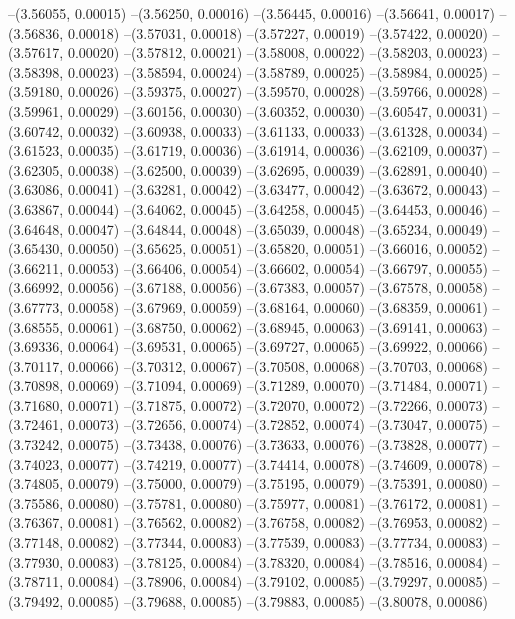 --(3.56055, 0.00015)
--(3.56250, 0.00016)
--(3.56445, 0.00016)
--(3.56641, 0.00017)
--(3.56836, 0.00018)
--(3.57031, 0.00018)
--(3.57227, 0.00019)
--(3.57422, 0.00020)
--(3.57617, 0.00020)
--(3.57812, 0.00021)
--(3.58008, 0.00022)
--(3.58203, 0.00023)
--(3.58398, 0.00023)
--(3.58594, 0.00024)
--(3.58789, 0.00025)
--(3.58984, 0.00025)
--(3.59180, 0.00026)
--(3.59375, 0.00027)
--(3.59570, 0.00028)
--(3.59766, 0.00028)
--(3.59961, 0.00029)
--(3.60156, 0.00030)
--(3.60352, 0.00030)
--(3.60547, 0.00031)
--(3.60742, 0.00032)
--(3.60938, 0.00033)
--(3.61133, 0.00033)
--(3.61328, 0.00034)
--(3.61523, 0.00035)
--(3.61719, 0.00036)
--(3.61914, 0.00036)
--(3.62109, 0.00037)
--(3.62305, 0.00038)
--(3.62500, 0.00039)
--(3.62695, 0.00039)
--(3.62891, 0.00040)
--(3.63086, 0.00041)
--(3.63281, 0.00042)
--(3.63477, 0.00042)
--(3.63672, 0.00043)
--(3.63867, 0.00044)
--(3.64062, 0.00045)
--(3.64258, 0.00045)
--(3.64453, 0.00046)
--(3.64648, 0.00047)
--(3.64844, 0.00048)
--(3.65039, 0.00048)
--(3.65234, 0.00049)
--(3.65430, 0.00050)
--(3.65625, 0.00051)
--(3.65820, 0.00051)
--(3.66016, 0.00052)
--(3.66211, 0.00053)
--(3.66406, 0.00054)
--(3.66602, 0.00054)
--(3.66797, 0.00055)
--(3.66992, 0.00056)
--(3.67188, 0.00056)
--(3.67383, 0.00057)
--(3.67578, 0.00058)
--(3.67773, 0.00058)
--(3.67969, 0.00059)
--(3.68164, 0.00060)
--(3.68359, 0.00061)
--(3.68555, 0.00061)
--(3.68750, 0.00062)
--(3.68945, 0.00063)
--(3.69141, 0.00063)
--(3.69336, 0.00064)
--(3.69531, 0.00065)
--(3.69727, 0.00065)
--(3.69922, 0.00066)
--(3.70117, 0.00066)
--(3.70312, 0.00067)
--(3.70508, 0.00068)
--(3.70703, 0.00068)
--(3.70898, 0.00069)
--(3.71094, 0.00069)
--(3.71289, 0.00070)
--(3.71484, 0.00071)
--(3.71680, 0.00071)
--(3.71875, 0.00072)
--(3.72070, 0.00072)
--(3.72266, 0.00073)
--(3.72461, 0.00073)
--(3.72656, 0.00074)
--(3.72852, 0.00074)
--(3.73047, 0.00075)
--(3.73242, 0.00075)
--(3.73438, 0.00076)
--(3.73633, 0.00076)
--(3.73828, 0.00077)
--(3.74023, 0.00077)
--(3.74219, 0.00077)
--(3.74414, 0.00078)
--(3.74609, 0.00078)
--(3.74805, 0.00079)
--(3.75000, 0.00079)
--(3.75195, 0.00079)
--(3.75391, 0.00080)
--(3.75586, 0.00080)
--(3.75781, 0.00080)
--(3.75977, 0.00081)
--(3.76172, 0.00081)
--(3.76367, 0.00081)
--(3.76562, 0.00082)
--(3.76758, 0.00082)
--(3.76953, 0.00082)
--(3.77148, 0.00082)
--(3.77344, 0.00083)
--(3.77539, 0.00083)
--(3.77734, 0.00083)
--(3.77930, 0.00083)
--(3.78125, 0.00084)
--(3.78320, 0.00084)
--(3.78516, 0.00084)
--(3.78711, 0.00084)
--(3.78906, 0.00084)
--(3.79102, 0.00085)
--(3.79297, 0.00085)
--(3.79492, 0.00085)
--(3.79688, 0.00085)
--(3.79883, 0.00085)
--(3.80078, 0.00086)
